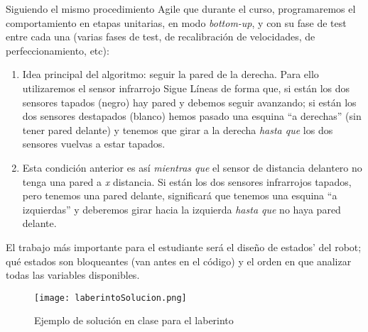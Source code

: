 \begin{description}
	Siguiendo el mismo procedimiento Agile que durante el curso, programaremos el \break comportamiento en etapas unitarias, en modo \textit{bottom-up}, y con su fase de test entre cada una (varias fases de test, de recalibración de velocidades, de perfeccionamiento, etc):
	\begin{enumerate}
		\item Idea principal del algoritmo: seguir la pared de la derecha. Para ello utilizaremos el sensor infrarrojo Sigue Líneas de forma que, si están los dos sensores tapados (negro) hay pared y debemos seguir avanzando; si están los dos sensores destapados (blanco) hemos pasado una esquina ``a derechas'' (sin tener pared delante) y tenemos que girar a la derecha \textit{hasta que} los dos sensores vuelvas a estar tapados.
		\item Esta condición anterior es así \textit{mientras que} el sensor de distancia delantero no tenga una pared a \textit{x} distancia. Si están los dos sensores infrarrojos tapados, pero tenemos una pared delante, significará que tenemos una esquina ``a izquierdas'' y deberemos girar hacia la izquierda \textit{hasta que} no haya pared delante.
		
	\end{enumerate}
	El trabajo más importante para el estudiante será el diseño de estados' del robot; qué estados son bloqueantes (van antes en el código) y el orden en que analizar todas las variables disponibles.
	
	\begin{figure}[H]
		\texttt{[image: laberintoSolucion.png]}
		\centering
		\label{img:laberintoSolucion}
		\caption{Ejemplo de solución en clase para el laberinto}
	\end{figure}
	

\end{description}
